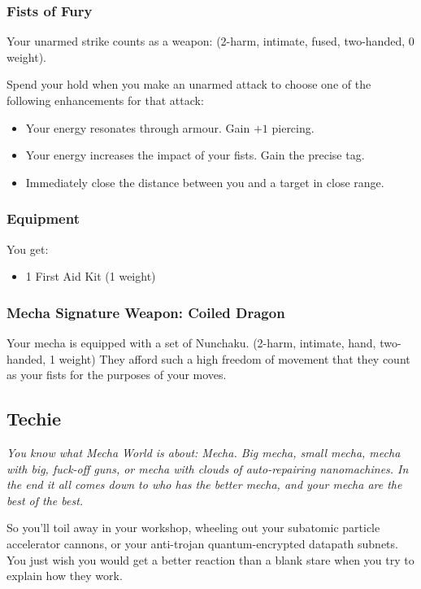 \subsubsection{Fists of Fury}
Your unarmed strike counts as a weapon: (2-harm, intimate, fused, two-handed, 0 weight).


Spend your hold when you make an unarmed attack to choose one of the following enhancements for that attack:
\begin{itemize}
\item Your energy resonates through armour. Gain $+1$ piercing.
\item Your energy increases the impact of your fists. Gain the precise tag.
\item Immediately close the distance between you and a target in close range.
\end{itemize}

\subsubsection{Equipment}

You get:
\begin{itemize}
\item 1 First Aid Kit (1 weight)
\end{itemize}

\subsubsection{Mecha Signature Weapon: Coiled Dragon}
Your mecha is equipped with a set of Nunchaku. (2-harm, intimate, hand, two-handed, 1 weight) They afford such a high freedom of movement that they count as your fists for the purposes of your moves.




\subsection{Techie}
{\itshape You know what Mecha World is about: Mecha. Big mecha, small
  mecha, mecha with big, fuck-off guns, or mecha with clouds of
  auto-repairing nanomachines. In the end it all comes down to who has
  the better mecha, and your mecha are the best of the best.

So you'll toil away in your workshop, wheeling out your subatomic
particle accelerator cannons, or your anti-trojan quantum-encrypted
datapath subnets. You just wish you would get a better reaction than a
blank stare when you try to explain how they work.}

